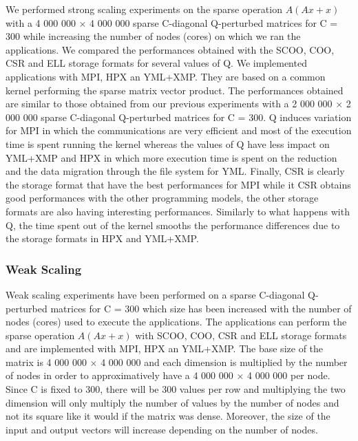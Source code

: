 We performed strong scaling experiments on the sparse operation $A(Ax+x)$ with a 4 000 000 $\times$ 4 000 000 sparse C-diagonal Q-perturbed matrices for C = 300 while increasing the number of nodes (cores) on which we ran the applications.
We compared the performances obtained with the SCOO, COO, CSR and ELL storage formats for several values of Q.
We implemented applications with MPI, HPX an YML+XMP.
They are based on a common kernel performing the sparse matrix vector product.
The performances obtained are similar to those obtained from our previous experiments with a 2 000 000 $\times$ 2 000 000 sparse C-diagonal Q-perturbed matrices for C = 300.
Q induces variation for MPI in which the communications are very efficient and most of the execution time is spent running the kernel whereas the values of Q have less impact on YML+XMP and HPX in which more execution time is spent on the reduction and the data migration through the file system for YML.
Finally, CSR is clearly the storage format that have the best performances for MPI while it CSR obtains good performances with the other programming models, the other storage formats are also having interesting performances.
Similarly to what happens with Q, the time spent out of the kernel smooths the performance differences due to the storage formats in HPX and YML+XMP.

\subsubsection{Weak Scaling}

Weak scaling experiments have been performed on a sparse C-diagonal Q-perturbed matrices for C = 300 which size has been increased with the number of nodes (cores) used to execute the applications.
The applications can perform the sparse operation $A(Ax+x)$ with SCOO, COO, CSR and ELL storage formats and are implemented with MPI, HPX an YML+XMP.
The base size of the matrix is 4 000 000 $\times$ 4 000 000 and each dimension is multiplied by the number of nodes in order to approximatively have a 4 000 000 $\times$ 4 000 000 per node.
Since C is fixed to 300, there will be 300 values per row and multiplying the two dimension will only multiply the number of values by the number of nodes and not its square like it would if the matrix was dense.
Moreover, the size of the input and output vectors will increase depending on the number of nodes.

